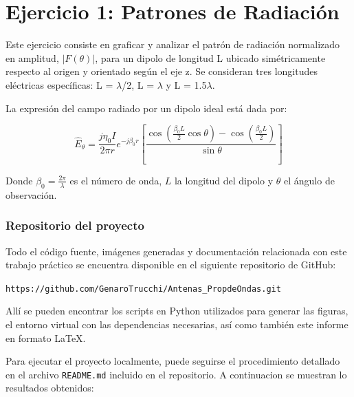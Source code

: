 \section{Ejercicio 1: Patrones de Radiación}
Este ejercicio consiste en graficar y analizar el patrón de radiación normalizado en amplitud, $|F(\theta)|$, para un dipolo de longitud L ubicado simétricamente respecto al origen y orientado según el eje z. Se consideran tres longitudes eléctricas específicas: L = $\lambda$/2, L = $\lambda$ y L = 1.5$\lambda$.


La expresión del campo radiado por un dipolo ideal está dada por:

\[
\hat{E}_\theta = \frac{j \eta_0 I}{2\pi r} e^{-j\beta_0 r} \left[ \frac{\cos\left(\frac{\beta_0 L}{2} \cos\theta\right) - \cos\left(\frac{\beta_0 L}{2}\right)}{\sin\theta} \right]
\]

Donde $\beta_0 = \frac{2\pi}{\lambda}$ es el número de onda, $L$ la longitud del dipolo y $\theta$ el ángulo de observación.

\subsubsection*{Repositorio del proyecto}

Todo el código fuente, imágenes generadas y documentación relacionada con este trabajo práctico se encuentra disponible en el siguiente repositorio de GitHub:

\begin{center}
\texttt{https://github.com/GenaroTrucchi/Antenas_PropdeOndas.git}
\end{center}

Allí se pueden encontrar los scripts en Python utilizados para generar las figuras, el entorno virtual con las dependencias necesarias, así como también este informe en formato \LaTeX{}.

Para ejecutar el proyecto localmente, puede seguirse el procedimiento detallado en el archivo \texttt{README.md} incluido en el repositorio.
A continuacion se muestran lo resultados obtenidos:

\def\relativelengths{{0.12},{0.25},{0.50},{0.75},{1.25},{1.50},{1.75},{2.00},{2.25}}

\newcommand{\incluirImagenes}[1]{
  \begin{figure}
    \centering
    \begin{subfigure}[b]{0.45\textwidth}
        \texttt{[image: Imagenes2D/2D\_Lrel\_\#1.png]}
        \caption{Gráfico 2D}
    \end{subfigure}
    \begin{subfigure}[b]{0.45\textwidth}
        \texttt{[image: Imagenes3D/3D\_Lrel\_\#1.png]}
        \caption{Gráfico 3D}
    \end{subfigure}
    \caption{Patrón de radiación para $L/\lambda = #1$}
  \end{figure}
}


